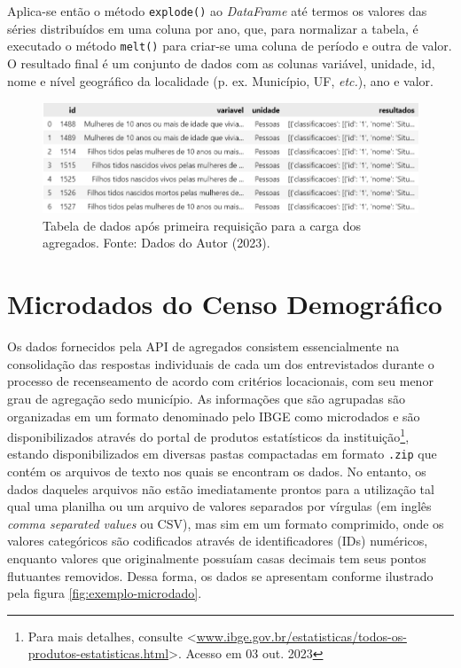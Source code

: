     Aplica-se então o método \verb|explode()| ao \textit{DataFrame} até termos os valores das séries distribuídos em uma coluna por ano, que, para normalizar a tabela, é executado o método \verb|melt()| para criar-se uma coluna de período e outra de valor. O resultado final é um conjunto de dados com as colunas variável, unidade, id, nome e nível geográfico da localidade (p. ex. Município, UF, \textit{etc.}), ano e valor.

\begin{figure}[ht]
    \centering
    \includegraphics[width=\textwidth]{files/img/tabela_agregado_pt1.png}
    \caption{Tabela de dados após primeira requisição para a carga dos agregados. Fonte: Dados do Autor (2023).}
    \label{fig:tabela-agregado-pt1}
\end{figure}



    


\section{Microdados do Censo Demográfico}
\label{sec-microdados}

    Os dados fornecidos pela API de agregados consistem essencialmente na consolidação das respostas individuais de cada um dos entrevistados durante o processo de recenseamento de acordo com critérios locacionais, com seu menor grau de agregação sedo município. As informações que são agrupadas são organizadas em um formato denominado pelo IBGE como microdados e são disponibilizados através do portal de produtos estatísticos da instituição\footnote{Para mais detalhes, consulte <\url{www.ibge.gov.br/estatisticas/todos-os-produtos-estatisticas.html}>. Acesso em 03 out. 2023}, estando disponibilizados em diversas pastas compactadas em formato \verb|.zip| que contém os arquivos de texto nos quais se encontram os dados. No entanto, os dados daqueles arquivos não estão imediatamente prontos para a utilização tal qual uma planilha ou um arquivo de valores separados por vírgulas (em inglês \textit{comma separated values} ou CSV), mas sim em um formato comprimido, onde os valores categóricos são codificados através de identificadores (IDs) numéricos, enquanto valores que originalmente possuíam casas decimais tem seus pontos flutuantes removidos. Dessa forma, os dados se apresentam conforme ilustrado pela figura \ref{fig:exemplo-microdado}.

